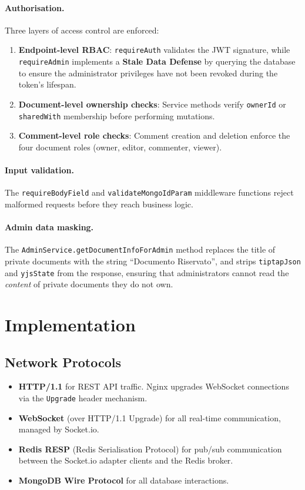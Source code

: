 \documentclass{scrartcl}
\begin{document}
  \paragraph{Authorisation.}
  Three layers of access control are enforced:
  \begin{enumerate}
    \item \textbf{Endpoint-level RBAC}: \texttt{requireAuth} validates the JWT signature,
    while \texttt{requireAdmin} implements a \textbf{Stale Data Defense} by querying the database
    to ensure the administrator privileges have not been revoked during the token's lifespan.
    \item \textbf{Document-level ownership checks}: Service methods verify \texttt{ownerId}
    or \texttt{sharedWith} membership before performing mutations.
    \item \textbf{Comment-level role checks}: Comment creation and deletion enforce the four
    document roles (owner, editor, commenter, viewer).
  \end{enumerate}

  \paragraph{Input validation.}
  The \texttt{requireBodyField} and \texttt{validateMongoIdParam} middleware functions reject
  malformed requests before they reach business logic.

  \paragraph{Admin data masking.}
  The \texttt{AdminService.getDocumentInfoForAdmin} method replaces the title of private
  documents with the string ``Documento Riservato'', and strips \texttt{tiptapJson} and
  \texttt{yjsState} from the response, ensuring that administrators cannot read the
  \emph{content} of private documents they do not own.


  \section{Implementation}\label{implementation}

  \subsection{Network Protocols}

  \begin{itemize}
    \item \textbf{HTTP/1.1} for REST API traffic. Nginx upgrades WebSocket connections via the
    \texttt{Upgrade} header mechanism.
    \item \textbf{WebSocket} (over HTTP/1.1 Upgrade) for all real-time communication, managed
    by Socket.io.
    \item \textbf{Redis RESP} (Redis Serialisation Protocol) for pub/sub communication between
    the Socket.io adapter clients and the Redis broker.
    \item \textbf{MongoDB Wire Protocol} for all database interactions.
  \end{itemize}
\end{document}
